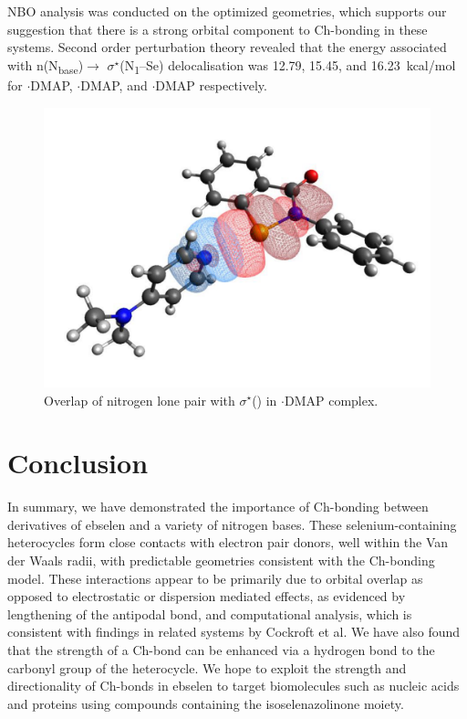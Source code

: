 \begin{refsection}
NBO analysis was conducted on the optimized geometries, which supports our suggestion that there is a strong orbital component to Ch-bonding in these systems.
Second order perturbation theory revealed that the energy associated with n(N\textsubscript{base})$ \rightarrow $ $ \sigma^{\star} $(N\textsubscript{1}--Se) delocalisation was 12.79, 15.45, and 16.23~kcal/mol for $ \cdot $DMAP, $ \cdot $DMAP, and $ \cdot $DMAP respectively.

\begin{figure}
  \centering
  \includegraphics[width=0.6\linewidth]{Figures/phenyl-dmap-overlap.pdf}
  \caption[Orbital overlap for $ \cdot $DMAP.]{Overlap of nitrogen lone pair with $ \sigma^{\star} $() in $ \cdot $DMAP complex.}\label{fig:phenyl-dmap-overlap}
\end{figure}

\section{Conclusion}
In summary, we have demonstrated the importance of Ch-bonding between derivatives of ebselen  and a variety of nitrogen bases.
These selenium-containing heterocycles form close contacts with electron pair donors, well within the Van der Waals radii, with predictable geometries consistent with the Ch-bonding model.
These interactions appear to be primarily due to orbital overlap as opposed to electrostatic or dispersion mediated effects, as evidenced by lengthening of the antipodal  bond, and computational analysis, which is consistent with findings in related systems by Cockroft et al.\autocite{Pascoe2017}
We have also found that the strength of a Ch-bond can be enhanced via a hydrogen bond to the carbonyl group of the heterocycle.
We hope to exploit the strength and directionality of Ch-bonds in ebselen to target biomolecules such as nucleic acids and proteins using compounds containing the isoselenazolinone moiety.


\end{refsection}
